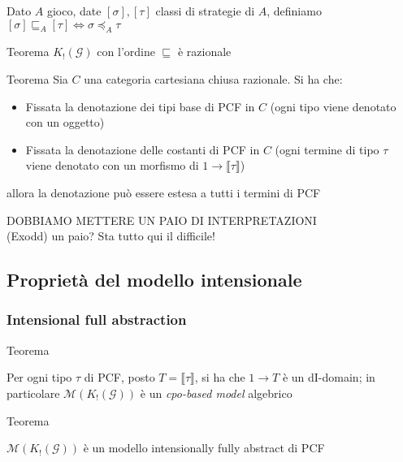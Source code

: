 \documentclass{beamer}
\begin{document}
\begin{frame}
	
	Dato $A$ gioco, date $[\sigma],[\tau]$ classi di strategie di $A$, definiamo
	$[\sigma] \sqsubseteq_A [\tau] \Leftrightarrow \sigma \preccurlyeq_A \tau$ \\
	\begin{block}{Teorema}
		$K_! (\mathcal{G})$ con l'ordine $\sqsubseteq$ è razionale
	\end{block}
	
	\begin{block}{Teorema}
		Sia $C$ una categoria cartesiana chiusa razionale. Si ha che:
		\begin{itemize}
			\item Fissata la denotazione dei tipi base di PCF in $C$ (ogni tipo viene denotato con un oggetto)
			\item Fissata la denotazione delle costanti di PCF in $C$ (ogni termine di tipo $\tau$ viene denotato con un morfismo di $1\rightarrow \llbracket \tau \rrbracket$)
		\end{itemize}
		allora la denotazione può essere estesa a tutti i termini di PCF
		
	\end{block}
	
\end{frame}

\begin{frame}
	
	DOBBIAMO METTERE UN PAIO DI INTERPRETAZIONI\\
	(Exodd) un paio? Sta tutto qui il difficile!
	
\end{frame}



\subsection{Proprietà del modello intensionale}

\begin{frame}
	
	\frametitle{Intensional full abstraction}
	
	
	\begin{block}{Teorema}
		
		Per ogni tipo $\tau$ di PCF, posto $T= \llbracket \tau \rrbracket$, si ha che $1 \rightarrow T$ è un dI-domain;
		in particolare $\mathcal{M}(K_! (\mathcal{G}) )$ è un \emph{cpo-based model} algebrico
		
	\end{block}
	
	
	\begin{block}{Teorema}
		
		$\mathcal{M}(K_! (\mathcal{G}) )$ è un modello intensionally fully abstract di PCF
		
	\end{block}
	
	
\end{frame}
\end{document}
